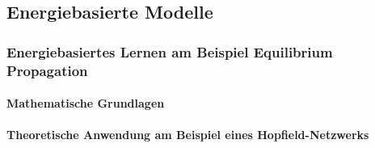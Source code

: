 \subsection{Energiebasierte Modelle}





\subsubsection{Energiebasiertes Lernen am Beispiel Equilibrium Propagation}

\paragraph{Mathematische Grundlagen}

\paragraph{Theoretische Anwendung am Beispiel eines Hopfield-Netzwerks}
